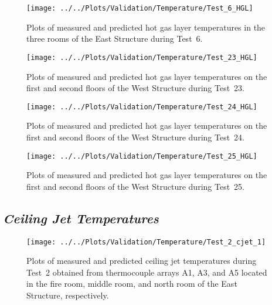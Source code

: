 \begin{figure}[!h]
	\centering
	\texttt{[image: ../../Plots/Validation/Temperature/Test\_6\_HGL]}
	\caption[Plots of measured and predicted hot gas layer temperatures during Test~6.]{Plots of measured and predicted hot gas layer temperatures in the three rooms of the East Structure during Test~6.}
	\label{fig:HGL_data_Test6}
\end{figure}

\begin{figure}[!h]
	\centering
	\texttt{[image: ../../Plots/Validation/Temperature/Test\_23\_HGL]}
	\caption[Plots of measured and predicted hot gas layer temperatures during Test~23.]{Plots of measured and predicted hot gas layer temperatures on the first and second floors of the West Structure during Test~23.}
	\label{fig:HGL_data_Test23}
\end{figure}

\begin{figure}[!h]
	\centering
	\texttt{[image: ../../Plots/Validation/Temperature/Test\_24\_HGL]}
	\caption[Plots of measured and predicted hot gas layer temperatures during Test~24.]{Plots of measured and predicted hot gas layer temperatures on the first and second floors of the West Structure during Test~24.}
	\label{fig:HGL_data_Test24}
\end{figure}

\begin{figure}[!h]
	\centering
	\texttt{[image: ../../Plots/Validation/Temperature/Test\_25\_HGL]}
	\caption[Plots of measured and predicted hot gas layer temperatures during Test~25.]{Plots of measured and predicted hot gas layer temperatures on the first and second floors of the West Structure during Test~25.}
	\label{fig:HGL_data_Test25}
\end{figure}

\clearpage
\subsection*{\textit{Ceiling Jet Temperatures}}
\begin{figure}[!h]
	\centering
	\texttt{[image: ../../Plots/Validation/Temperature/Test\_2\_cjet\_1]}
	\caption[Plots of measured and predicted ceiling jet temperatures during Test~2.]{Plots of measured and predicted ceiling jet temperatures during Test~2 obtained from thermocouple arrays A1, A3, and A5 located in the fire room, middle room, and north room of the East Structure, respectively.}
	\label{fig:cjet1_data_Test2}
\end{figure}

